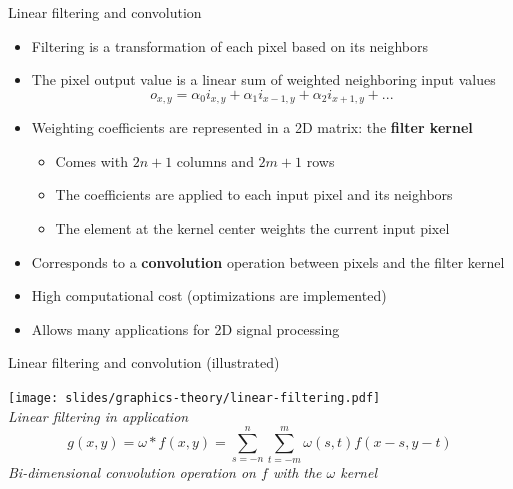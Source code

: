 \begin{frame}{Linear filtering and convolution}
  \begin{itemize}
  \item Filtering is a transformation of each pixel based on its neighbors
  \item The pixel output value is a linear sum of weighted neighboring input values
\[
o_{x,y} = \alpha_0 i_{x,y} + \alpha_1 i_{x-1,y} + \alpha_2 i_{x+1,y} + ...
\]
  \item Weighting coefficients are represented in a 2D matrix: the \textbf{filter kernel}
    \begin{itemize}
    \item Comes with \(2n + 1\) columns and \(2m + 1\) rows
    \item The coefficients are applied to each input pixel and its neighbors
    \item The element at the kernel center weights the current input pixel
    \end{itemize}
  \item Corresponds to a \textbf{convolution} operation between pixels and the filter kernel
  \item High computational cost (optimizations are implemented)
  \item Allows many applications for 2D signal processing
  \end{itemize}
\end{frame}

\begin{frame}{Linear filtering and convolution (illustrated)}
  \begin{center}
  \texttt{[image: slides/graphics-theory/linear-filtering.pdf]}\\
  \textit{\small Linear filtering in application}
\[
g(x,y)= \omega *f(x,y)=\sum_{s=-n}^n{\sum_{t=-m}^m{ \omega (s,t)f(x-s,y-t)}}
\]
  \textit{\small Bi-dimensional convolution operation on \(f\) with the \(\omega\) kernel}
  \end{center}
\end{frame}

